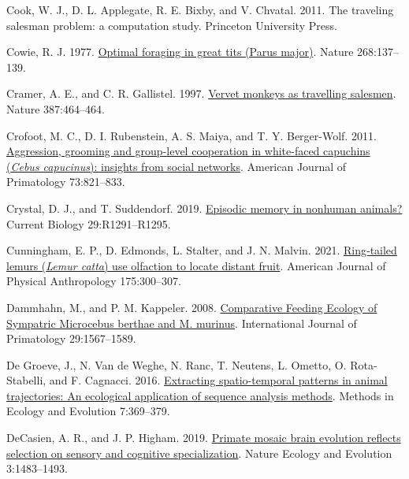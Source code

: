 \documentclass[twoside,12pt,final]{ucthesis-CA2012}
\newenvironment{CSLReferences}%
  {}%
  {\par}
\begin{document}
\begin{ucmainmatter}
\begin{CSLReferences}{1}{0}
\leavevmode{}%
Cook, W. J., D. L. Applegate, R. E. Bixby, and V. Chvatal. 2011. The traveling salesman problem: a computation study. Princeton University Press.

\leavevmode{}%
Cowie, R. J. 1977. \href{https://doi.org/10.1038/268137a0}{Optimal foraging in great tits (Parus major)}. Nature 268:137--139.

\leavevmode{}%
Cramer, A. E., and C. R. Gallistel. 1997. \href{https://doi.org/10.1038/387464a0}{Vervet monkeys as travelling salesmen}. Nature 387:464--464.

\leavevmode{}%
Crofoot, M. C., D. I. Rubenstein, A. S. Maiya, and T. Y. Berger-Wolf. 2011. \href{https://doi.org/10.1002/ajp.20959}{Aggression, grooming and group-level cooperation in white-faced capuchins (\emph{Cebus capucinus}): insights from social networks}. American Journal of Primatology 73:821--833.

\leavevmode{}%
Crystal, D. J., and T. Suddendorf. 2019. \href{https://doi.org/10.1016/j.cub.2013.07.016}{Episodic memory in nonhuman animals?} Current Biology 29:R1291--R1295.

\leavevmode{}%
Cunningham, E. P., D. Edmonds, L. Stalter, and J. N. Malvin. 2021. \href{https://doi.org/10.1002/ajpa.24255}{Ring‐tailed lemurs (\emph{Lemur catta}) use olfaction to locate distant fruit}. American Journal of Physical Anthropology 175:300--307.

\leavevmode{}%
Dammhahn, M., and P. M. Kappeler. 2008. \href{https://doi.org/10.1007/s10764-008-9312-3}{Comparative Feeding Ecology of Sympatric Microcebus berthae and M. murinus}. International Journal of Primatology 29:1567--1589.

\leavevmode{}%
De Groeve, J., N. Van de Weghe, N. Ranc, T. Neutens, L. Ometto, O. Rota-Stabelli, and F. Cagnacci. 2016. \href{https://doi.org/10.1111/2041-210X.12453}{Extracting spatio-temporal patterns in animal trajectories: An ecological application of sequence analysis methods}. Methods in Ecology and Evolution 7:369--379.

\leavevmode{}%
DeCasien, A. R., and J. P. Higham. 2019. \href{https://doi.org/10.1038/s41559-019-0969-0}{Primate mosaic brain evolution reflects selection on sensory and cognitive specialization}. Nature Ecology and Evolution 3:1483--1493.


\end{CSLReferences}
\end{ucmainmatter}
\end{document}

